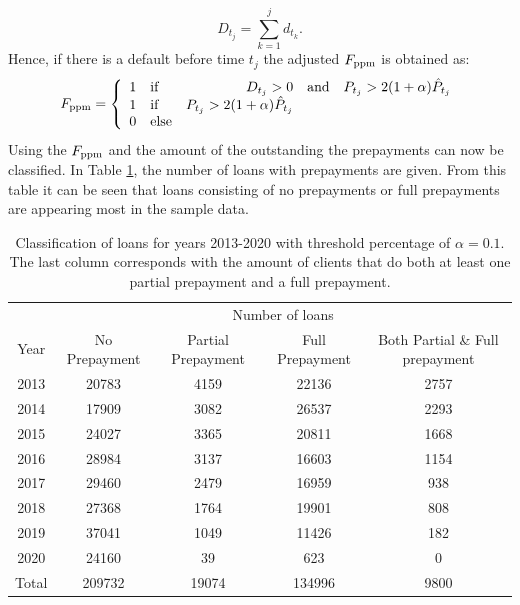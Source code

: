        \begin{equation}
            D_{t_j} = \displaystyle\sum_{k=1}^{j} d_{t_k}.
        \end{equation}
        Hence, if 
        there is a default before time $t_j$ the adjusted 
        $F_{\text{ppm}}$ is obtained as: 
        \begin{equation}
            F_{\text{ppm}} = \left\{
                \begin{array}{l l r l l }
                    1 & \text{if} & D_{t_j} > 0 & \text{and} &
                    P_{t_j} > 2(1 + \alpha) \hat{P}_{t_j} \\ 
                    1 & \text{if} & 
                    P_{t_j} > 2(1 + \alpha) \hat{P}_{t_j} \\ 
                    0 & \text{else}
                \end{array}
            \right.
        \end{equation}
        Using the $F_{\text{ppm}}$ and the amount of the outstanding
        the prepayments can now be classified.  
        In Table 
        \ref{model_classficationprepayment_table}, the number of 
        loans with prepayments are given. 
        From this table it can be seen that 
        loans consisting of no prepayments or full prepayments 
        are appearing most in the sample data.
        \begin{table}[H]
        \centering
            \begin{tabular}{c|c|c|c|c}
                & \multicolumn{4}{c}{Number of loans} \\
                Year&No Prepayment&Partial Prepayment&Full Prepayment &Both Partial \& Full prepayment  \\\hline
                2013 & 20783 & 4159 & 22136 & 2757\\
                2014 & 17909 & 3082 & 26537 & 2293\\
                2015 & 24027 & 3365 & 20811 & 1668 \\
                2016 & 28984 & 3137 & 16603 & 1154 \\
                2017 & 29460 & 2479 & 16959 & 938 \\
                2018 & 27368 & 1764 & 19901 & 808 \\
                2019 & 37041 & 1049 & 11426 & 182 \\
                2020 & 24160 & 39 & 623 & 0 \\\hline
                Total & 209732 & 19074 & 134996 & 9800
		    \end{tabular}
		    \caption{Classification of loans for years 2013-2020 with 
            threshold percentage of $\alpha = 0.1$. 
            The last column corresponds with the amount of 
            clients that do both at least one partial prepayment and a 
            full prepayment.}
		    \label{model_classficationprepayment_table}
        \end{table}
